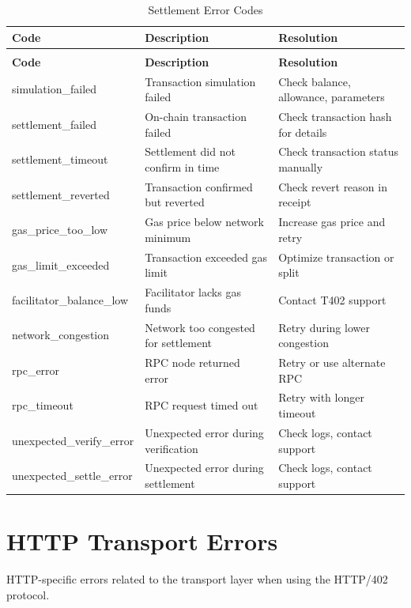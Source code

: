 \begin{longtable}{>{\ttfamily\footnotesize}l p{5cm} p{4cm}}
\caption{Settlement Error Codes} \label{tab:settlement-errors} \\
\toprule
\normalfont\textbf{Code} & \textbf{Description} & \textbf{Resolution} \\
\midrule
\endfirsthead
\multicolumn{3}{c}{\tablename\ \thetable\ -- continued} \\
\toprule
\normalfont\textbf{Code} & \textbf{Description} & \textbf{Resolution} \\
\midrule
\endhead
\midrule
\endfoot
\bottomrule
\endlastfoot
simulation\_failed & Transaction simulation failed & Check balance, allowance, parameters \\
settlement\_failed & On-chain transaction failed & Check transaction hash for details \\
settlement\_timeout & Settlement did not confirm in time & Check transaction status manually \\
settlement\_reverted & Transaction confirmed but reverted & Check revert reason in receipt \\
gas\_price\_too\_low & Gas price below network minimum & Increase gas price and retry \\
gas\_limit\_exceeded & Transaction exceeded gas limit & Optimize transaction or split \\
facilitator\_balance\_low & Facilitator lacks gas funds & Contact T402 support \\
network\_congestion & Network too congested for settlement & Retry during lower congestion \\
rpc\_error & RPC node returned error & Retry or use alternate RPC \\
rpc\_timeout & RPC request timed out & Retry with longer timeout \\
unexpected\_verify\_error & Unexpected error during verification & Check logs, contact support \\
unexpected\_settle\_error & Unexpected error during settlement & Check logs, contact support \\
\end{longtable}

\section{HTTP Transport Errors}

HTTP-specific errors related to the transport layer when using the HTTP/402 protocol.

